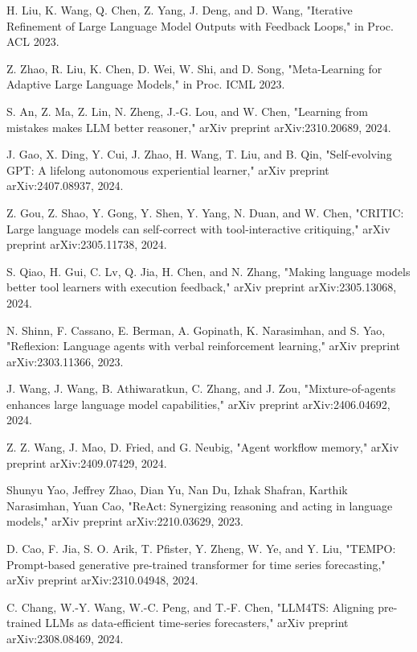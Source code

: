 \documentclass[conference]{IEEEtran}
\begin{document}
\begin{thebibliography}{00}
 H. Liu, K. Wang, Q. Chen, Z. Yang, J. Deng, and D. Wang, "Iterative Refinement of Large Language Model Outputs with Feedback Loops," in Proc. ACL 2023.

 Z. Zhao, R. Liu, K. Chen, D. Wei, W. Shi, and D. Song, "Meta-Learning for Adaptive Large Language Models," in Proc. ICML 2023.

 S. An, Z. Ma, Z. Lin, N. Zheng, J.-G. Lou, and W. Chen, "Learning from mistakes makes LLM better reasoner," arXiv preprint arXiv:2310.20689, 2024.

 J. Gao, X. Ding, Y. Cui, J. Zhao, H. Wang, T. Liu, and B. Qin, "Self-evolving GPT: A lifelong autonomous experiential learner," arXiv preprint arXiv:2407.08937, 2024.

 Z. Gou, Z. Shao, Y. Gong, Y. Shen, Y. Yang, N. Duan, and W. Chen, "CRITIC: Large language models can self-correct with tool-interactive critiquing," arXiv preprint arXiv:2305.11738, 2024.

 S. Qiao, H. Gui, C. Lv, Q. Jia, H. Chen, and N. Zhang, "Making language models better tool learners with execution feedback," arXiv preprint arXiv:2305.13068, 2024.

 N. Shinn, F. Cassano, E. Berman, A. Gopinath, K. Narasimhan, and S. Yao, "Reflexion: Language agents with verbal reinforcement learning," arXiv preprint arXiv:2303.11366, 2023.

 J. Wang, J. Wang, B. Athiwaratkun, C. Zhang, and J. Zou, "Mixture-of-agents enhances large language model capabilities," arXiv preprint arXiv:2406.04692, 2024.

 Z. Z. Wang, J. Mao, D. Fried, and G. Neubig, "Agent workflow memory," arXiv preprint arXiv:2409.07429, 2024.

 Shunyu Yao, Jeffrey Zhao, Dian Yu, Nan Du, Izhak Shafran, Karthik Narasimhan, Yuan Cao, "ReAct: Synergizing reasoning and acting in language models," arXiv preprint arXiv:2210.03629, 2023.

 D. Cao, F. Jia, S. O. Arik, T. Pfister, Y. Zheng, W. Ye, and Y. Liu, "TEMPO: Prompt-based generative pre-trained transformer for time series forecasting," arXiv preprint arXiv:2310.04948, 2024.

 C. Chang, W.-Y. Wang, W.-C. Peng, and T.-F. Chen, "LLM4TS: Aligning pre-trained LLMs as data-efficient time-series forecasters," arXiv preprint arXiv:2308.08469, 2024.


\end{thebibliography}
\end{document}
